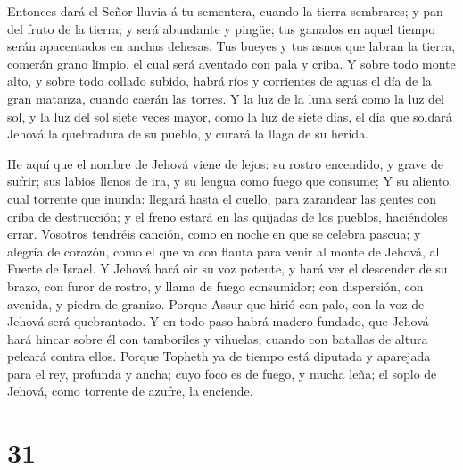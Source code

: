  Entonces dará el Señor lluvia á tu sementera, cuando la
tierra sembrares; y pan del fruto de la tierra; y será abundante y
pingüe; tus ganados en aquel tiempo serán apacentados en anchas dehesas.
 Tus bueyes y tus asnos que labran la tierra, comerán grano
limpio, el cual será aventado con pala y criba.  Y sobre
todo monte alto, y sobre todo collado subido, habrá ríos y corrientes de
aguas el día de la gran matanza, cuando caerán las torres. 
Y la luz de la luna será como la luz del sol, y la luz del sol siete
veces mayor, como la luz de siete días, el día que soldará Jehová la
quebradura de su pueblo, y curará la llaga de su herida.

 He aquí que el nombre de Jehová viene de lejos: su rostro
encendido, y grave de sufrir; sus labios llenos de ira, y su lengua como
fuego que consume;  Y su aliento, cual torrente que inunda:
llegará hasta el cuello, para zarandear las gentes con criba de
destrucción; y el freno estará en las quijadas de los pueblos,
haciéndoles errar.  Vosotros tendréis canción, como en
noche en que se celebra pascua; y alegría de corazón, como el que va con
flauta para venir al monte de Jehová, al Fuerte de Israel. 
Y Jehová hará oir su voz potente, y hará ver el descender de su brazo,
con furor de rostro, y llama de fuego consumidor; con dispersión, con
avenida, y piedra de granizo.  Porque Assur que hirió con
palo, con la voz de Jehová será quebrantado.  Y en todo
paso habrá madero fundado, que Jehová hará hincar sobre él con
tamboriles y vihuelas, cuando con batallas de altura peleará contra
ellos.  Porque Topheth ya de tiempo está diputada y
aparejada para el rey, profunda y ancha; cuyo foco es de fuego, y mucha
leña; el soplo de Jehová, como torrente de azufre, la enciende.

\hypertarget{section-30}{%
\section{31}\label{section-30}}

